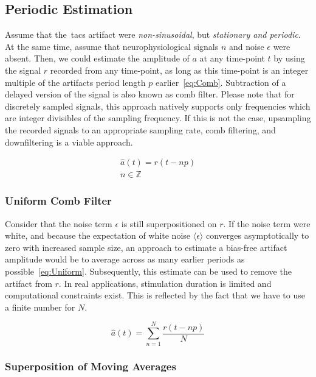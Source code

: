 \documentclass[a4paper]{article}
\begin{document}
\subsection{Periodic Estimation}
Assume that the~\gls{tacs} artifact were \emph{non-sinusoidal}, but \emph{stationary and periodic}. At the same time, assume that neurophysiological signals $n$ and noise $\epsilon$ were absent.
Then, we could estimate the amplitude of $a$ at any time-point $t$ by using the signal $r$ recorded from any time-point, as long as this time-point is an integer multiple of the artifacts period length $p$ earlier~\eqref{eq:Comb}.
Subtraction of a delayed version of the signal is also known as comb filter. Please note that for discretely sampled signals, this approach natively supports only frequencies which are integer divisibles of the sampling frequency. If this is not the case, upsampling the recorded signals to an appropriate sampling rate, comb filtering, and downfiltering is a viable approach.

\begin{eqnarray}
    \hat{a}(t) = r(t-np)\label{eq:Comb}\\
    n \in \mathbb{Z}
\end{eqnarray}

\subsubsection{Uniform Comb Filter}

Consider that the noise term $\epsilon$ is still superpositioned on $r$. If the noise term were white, and because the expectation of white noise $\langle\epsilon\rangle$ converges asymptotically to zero with increased sample size, an approach to estimate a bias-free  artifact amplitude would be to average across as many earlier periods as possible~\eqref{eq:Uniform}.
Subsequently, this estimate can be used to  remove the artifact from $r$.
In real applications, stimulation duration is limited and computational constraints exist. This is reflected by the fact that we have to use a finite number for $N$.

\begin{equation}
    \hat{a}(t) = \sum_{n=1}^{N} \frac{r(t - np)}{N}\label{eq:Uniform}
\end{equation}

\subsubsection{Superposition of Moving Averages}
\end{document}
